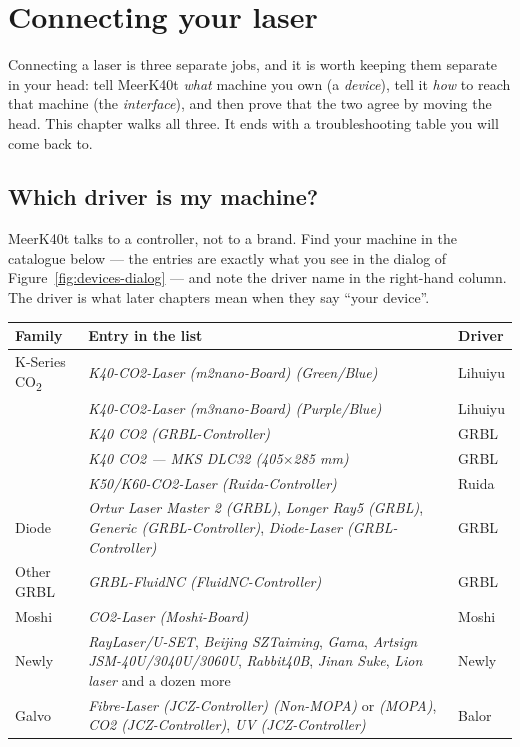 \chapter{Connecting your laser}
\label{ch:connect}

Connecting a laser is three separate jobs, and it is worth keeping them separate
in your head: tell MeerK40t \emph{what} machine you own (a \emph{device}), tell it
\emph{how} to reach that machine (the \emph{interface}), and then prove that the
two agree by moving the head. This chapter walks all three. It ends with a
troubleshooting table you will come back to.

\section{Which driver is my machine?}

MeerK40t talks to a controller, not to a brand. Find your machine in the
catalogue below --- the entries are exactly what you see in the
 dialog of Figure~\ref{fig:devices-dialog} --- and note the
driver name in the right-hand column. The driver is what later chapters mean when
they say ``your device''.

\begin{center}\small
\begin{tabular}{@{}L{2.4cm}L{6.4cm}L{5.5cm}@{}}
\toprule
\textbf{Family} & \textbf{Entry in the list} & \textbf{Driver} \\
\midrule
K-Series CO\textsubscript{2} & \emph{K40-CO2-Laser (m2nano-Board) (Green/Blue)} &
Lihuiyu \\
& \emph{K40-CO2-Laser (m3nano-Board) (Purple/Blue)} & Lihuiyu \\
& \emph{K40 CO2 (GRBL-Controller)} & GRBL \\
& \emph{K40 CO2 --- MKS DLC32 (405$\times$285 mm)} & GRBL \\
& \emph{K50/K60-CO2-Laser (Ruida-Controller)} & Ruida \\
\midrule
Diode & \emph{Ortur Laser Master 2 (GRBL)},
\emph{Longer Ray5 (GRBL)}, \emph{Generic (GRBL-Controller)},
\emph{Diode-Laser (GRBL-Controller)} &
GRBL \\
\midrule
Other GRBL & \emph{GRBL-FluidNC (FluidNC-Controller)} & GRBL \\
\midrule
Moshi & \emph{CO2-Laser (Moshi-Board)} & Moshi \\
\midrule
Newly & \emph{RayLaser/U-SET}, \emph{Beijing SZTaiming}, \emph{Gama},
\emph{Artsign JSM-40U/3040U/3060U}, \emph{Rabbit40B}, \emph{Jinan Suke},
\emph{Lion laser} and a dozen more & Newly \\
\midrule
Galvo & \emph{Fibre-Laser (JCZ-Controller) (Non-MOPA)} or \emph{(MOPA)},
\emph{CO2 (JCZ-Controller)}, \emph{UV (JCZ-Controller)} & Balor \\
\bottomrule
\end{tabular}
\end{center}

